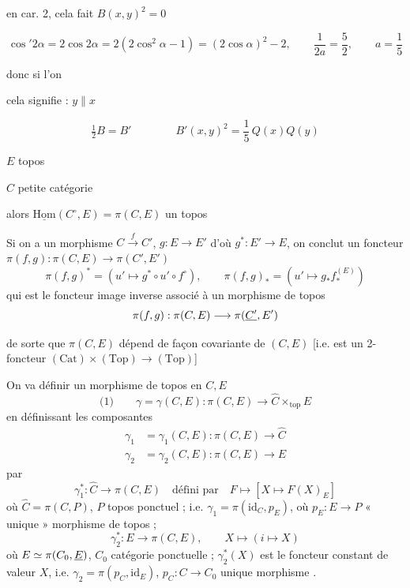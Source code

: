 \documentclass[11pt,a4paper]{article}
\begin{document}
en car. 2, cela fait $B(x,y)^2 = 0$

\[
\cos' 2\alpha = 2\cos 2\alpha = 2(2\cos^2\alpha - 1) = (2\cos\alpha)^2 - 2,
\qquad \frac{1}{2a} = \frac{5}{2}, \qquad a = \frac{1}{5}
\]

donc si l'on \ill{}  \ill{}

cela signifie :  $y \parallel x$

\[
\tfrac{1}{2}B = B' \qquad\qquad
\boxed{B'(x,y)^2 = \frac{1}{5}\,Q(x)Q(y)}
\]



$E$ topos

$C$ petite catégorie

alors $\underline{\mathrm{Hom}}(C^{\circ}, E) = \pi(C, E)$ un topos

Si on a un morphisme $C \xrightarrow{f} C'$, $g : E \to E'$ d'où
$g^{*} : E' \to E$, on conclut un foncteur $\pi(f, g) : \pi(C, E) \to \pi(C', E')$
\[
\pi(f, g)^{*} = (u' \mapsto g^{*} \circ u' \circ f^{\circ}), \qquad
\pi(f, g)_{*} = (u' \mapsto g_{*} f_{*}^{(E)})
\]
qui est le foncteur image inverse associé à un morphisme de topos
\[
\pi(f, g) : \pi(C, E) \longrightarrow \pi(\uncertain{C'}, E')
\]

de sorte que $\pi(C, E)$ dépend de façon covariante de $(C, E)$ [i.e. est
un 2-foncteur $(\mathrm{Cat}) \times (\mathrm{Top}) \to (\mathrm{Top})$]

On va définir un morphisme de topos  en $C, E$
\[
\text{(1)}\qquad
\boxed{\gamma = \gamma(C, E) : \pi(C, E) \longrightarrow \hat{C} \times_{\mathrm{top}} E}
\]
en définissant les composantes
\[
\begin{aligned}
\gamma_1 &= \gamma_1(C, E) : \pi(C, E) \to \hat{C} \\
\gamma_2 &= \gamma_2(C, E) : \pi(C, E) \to E
\end{aligned}
\]
par
\[
\gamma_1^{*} : \hat{C} \to \pi(C, E) \quad \text{défini par} \quad
F \mapsto [X \mapsto F(X)_E]
\]
où $\hat{C} = \pi(C, P)$, $P$ topos ponctuel ; i.e.
$\gamma_1 = \pi(\mathrm{id}_C, p_E)$, où $p_E : E \to P$ « unique »
morphisme de topos ;
\[
\gamma_2^{*} : E \to \pi(C, E), \qquad X \mapsto (i \mapsto X)
\]
où $E \simeq \pi(C_0, \uncertain{E})$, $C_0$ catégorie ponctuelle ;
$\gamma_2^{*}(X)$ est le foncteur constant de valeur $X$, i.e.
$\gamma_2 = \pi(p_C, \mathrm{id}_E)$, $p_C : C \to C_0$ unique morphisme
.
\end{document}
